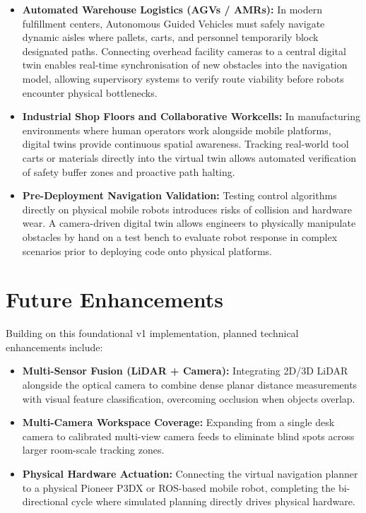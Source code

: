 \documentclass[10pt,a4paper]{article}
\begin{document}
\begin{itemize}
    \item \textbf{Automated Warehouse Logistics (AGVs / AMRs):} In modern fulfillment centers, Autonomous Guided Vehicles must safely navigate dynamic aisles where pallets, carts, and personnel temporarily block designated paths. Connecting overhead facility cameras to a central digital twin enables real-time synchronisation of new obstacles into the navigation model, allowing supervisory systems to verify route viability before robots encounter physical bottlenecks.

    \item \textbf{Industrial Shop Floors and Collaborative Workcells:} In manufacturing environments where human operators work alongside mobile platforms, digital twins provide continuous spatial awareness. Tracking real-world tool carts or materials directly into the virtual twin allows automated verification of safety buffer zones and proactive path halting.

    \item \textbf{Pre-Deployment Navigation Validation:} Testing control algorithms directly on physical mobile robots introduces risks of collision and hardware wear. A camera-driven digital twin allows engineers to physically manipulate obstacles by hand on a test bench to evaluate robot response in complex scenarios prior to deploying code onto physical platforms.
\end{itemize}

\section{Future Enhancements}

Building on this foundational v1 implementation, planned technical enhancements include:

\begin{itemize}
    \item \textbf{Multi-Sensor Fusion (LiDAR + Camera):} Integrating 2D/3D LiDAR alongside the optical camera to combine dense planar distance measurements with visual feature classification, overcoming occlusion when objects overlap.
    \item \textbf{Multi-Camera Workspace Coverage:} Expanding from a single desk camera to calibrated multi-view camera feeds to eliminate blind spots across larger room-scale tracking zones.
    \item \textbf{Physical Hardware Actuation:} Connecting the virtual navigation planner to a physical Pioneer P3DX or ROS-based mobile robot, completing the bi-directional cycle where simulated planning directly drives physical hardware.
\end{itemize}
\end{document}
